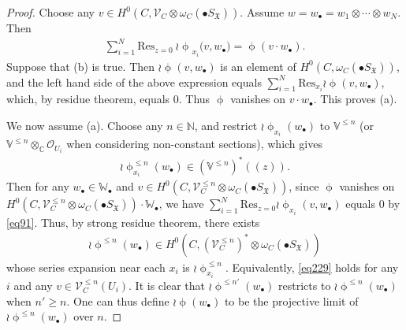 \documentclass[12pt,a4paper,notitlepage]{report}
\theoremstyle{definition}
\theoremstyle{plain}
\newcommand{\fk}{\mathfrak}
\newcommand{\Res}{\mathrm{Res}}
\newcommand{\scr}{\mathscr}
\newcommand{\blt}{\bullet}
\newcommand{\Vbb}{\mathbb V}
\newcommand{\Wbb}{\mathbb W}
\newcommand{\Cbb}{\mathbb C}
\newcommand{\Nbb}{\mathbb N}
\numberwithin{equation}{section}
\begin{document}
\begin{proof}
Choose any $v\in H^0(C,\scr V_C\otimes\omega_C(\blt S_{\fk X}))$. Assume $w=w_\blt=w_1\otimes\cdots\otimes w_N$. Then 
\begin{align}
\sum_{i=1}^N\Res_{z=0}~ {\wr\upphi}_{x_i}\big(v,w_\blt\big)=\upphi(v\cdot w_\blt).\label{eq91}
\end{align}
Suppose that (b) is true. Then  $\wr\upphi(v,w_\blt)$ is an element of $H^0(C,\omega_C(\blt S_{\fk X}))$, and the left hand side of the above expression equals $\sum_{i=1}^N \Res_{x_i}\wr\upphi(v,w_\blt)$, which, by residue theorem, equals $0$. Thus $\upphi$ vanishes on $v\cdot w_\blt$. This proves (a).

We now assume (a). Choose any $n\in\Nbb$, and restrict $\wr\upphi_{x_i}(w_\blt)$ to $\Vbb^{\leq n}$ (or $\Vbb^{\leq n}\otimes_{\Cbb}\scr O_{U_i}$ when considering non-constant sections), which gives
\begin{align*}
\wr\upphi_{x_i}^{\leq n}(w_\blt)\in (\Vbb^{\leq n})^*((z)).
\end{align*}
Then for any $w_\blt\in\Wbb_\blt$ and $v\in H^0(C,\scr V_C^{\leq n}\otimes\omega_C(\blt S_{\fk X}))$, since $\upphi$ vanishes on $H^0(C,\scr V_C^{\leq n}\otimes\omega_C(\blt S_{\fk X}))\cdot \Wbb_\blt$, we have $\sum_{i=1}^N \Res_{z=0}\wr\upphi_{x_i}(v,w_\blt)$ equals $0$ by \eqref{eq91}. Thus, by strong residue theorem, there exists
\begin{align*}
\wr\upphi^{\leq n}(w_\blt)\in H^0(C,(\scr V_C^{\leq n})^*\otimes\omega_C(\blt S_{\fk X}))
\end{align*}
whose series expansion near each $x_i$ is $\wr\upphi_{x_i}^{\leq n}$. Equivalently, \eqref{eq229} holds for any $i$ and any $v\in\scr V_C^{\leq n}(U_i)$. It is clear that $\wr\upphi^{\leq n'}(w_\blt)$ restricts to $\wr\upphi^{\leq n}(w_\blt)$ when $n'\geq n$. One can thus define $\wr\upphi(w_\blt)$ to be the projective limit of $\wr\upphi^{\leq n}(w_\blt)$ over $n$.
\end{proof}
\end{document}

